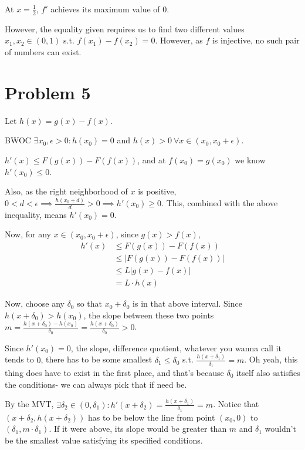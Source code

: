 \documentclass[12pt]{article}
\begin{document}
At $x=\frac{1}{2}$, $f'$ achieves its maximum value of $0$.

However, the equality given requires us to find two different values
$x_1, x_2 \in (0, 1)$ s.t. $f(x_1)-f(x_2)=0$.
However, as $f$ is injective, no such pair of numbers can exist.

\pagebreak

\section{Problem 5}

Let $h(x)=g(x)-f(x)$.

BWOC $\exists x_0, \epsilon > 0: h(x_0)=0$ and $h(x) > 0\ \forall x \in (x_0, x_0 + \epsilon)$.

$h'(x) \le F(g(x))-F(f(x))$, and at $f(x_0)=g(x_0)$ we know $h'(x_0) \le 0$.

Also, as the right neighborhood of $x$ is positive, $0 < d < \epsilon \implies \frac{h(x_0+d)}{d} > 0 \implies h'(x_0) \ge 0$.
This, combined with the above inequality, means $h'(x_0)=0$.

Now, for any $x \in (x_0, x_0 + \epsilon)$, since $g(x) > f(x)$,
\begin{align*}
  h'(x) & \le F(g(x))-F(f(x))   \\
        & \le |F(g(x))-F(f(x))| \\
        & \le L|g(x)-f(x)|      \\
        & = L \cdot h(x)
\end{align*}

Now, choose any $\delta_0$ so that $x_0 + \delta_0$ is in that above interval.
Since $h(x+\delta_0) > h(x_0)$,
the slope between these two points $m=\frac{h(x+\delta_0)-h(x_0)}{\delta_0}=\frac{h(x+\delta_0)}{\delta_0} > 0$.

Since $h'(x_0)=0$, the slope, difference quotient, whatever you wanna call it tends to $0$,
there has to be some smallest $\delta_1 \le \delta_0$ s.t. $\frac{h(x+\delta_1)}{\delta_1}=m$.
Oh yeah, this thing does have to exist in the first place, and that's because $\delta_0$
itself also satisfies the conditions- we can always pick that if need be.

By the MVT, $\exists \delta_2 \in (0, \delta_1): h'(x+\delta_2)=\frac{h(x+\delta_1)}{\delta_1} = m$.
Notice that $(x + \delta_2, h(x + \delta_2))$ has to be below the line from point $(x_0, 0)$ to $(\delta_1, m \cdot \delta_1)$.
If it were above, its slope would be greater than $m$
and $\delta_1$ wouldn't be the smallest value satisfying its specified conditions.
\end{document}
